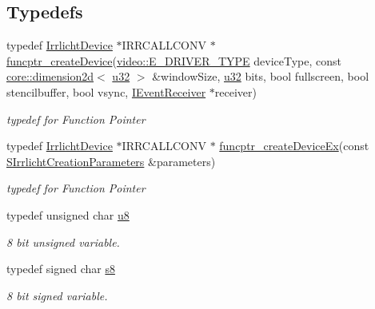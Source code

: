 \subsection*{Typedefs}
\begin{DoxyCompactItemize}
\item 
\mbox{\label{namespaceirr_a0ab845f2df3820e04106b7625e9919cd}} 
typedef \hyperlink{classirr_1_1IrrlichtDevice}{Irrlicht\+Device} $\ast$I\+R\+R\+C\+A\+L\+L\+C\+O\+NV $\ast$ \hyperlink{namespaceirr_a0ab845f2df3820e04106b7625e9919cd}{funcptr\+\_\+create\+Device}(\hyperlink{namespaceirr_1_1video_ae35a6de6d436c76107ad157fe42356d0}{video\+::\+E\+\_\+\+D\+R\+I\+V\+E\+R\+\_\+\+T\+Y\+PE} device\+Type, const \hyperlink{classirr_1_1core_1_1dimension2d}{core\+::dimension2d}$<$ \hyperlink{namespaceirr_a0416a53257075833e7002efd0a18e804}{u32} $>$ \&window\+Size, \hyperlink{namespaceirr_a0416a53257075833e7002efd0a18e804}{u32} bits, bool fullscreen, bool stencilbuffer, bool vsync, \hyperlink{classirr_1_1IEventReceiver}{I\+Event\+Receiver} $\ast$receiver)
\begin{DoxyCompactList}\small\item\em typedef for Function Pointer \end{DoxyCompactList}\item 
\mbox{\label{namespaceirr_a5137701377b2241305607fc37a27e9f8}} 
typedef \hyperlink{classirr_1_1IrrlichtDevice}{Irrlicht\+Device} $\ast$I\+R\+R\+C\+A\+L\+L\+C\+O\+NV $\ast$ \hyperlink{namespaceirr_a5137701377b2241305607fc37a27e9f8}{funcptr\+\_\+create\+Device\+Ex}(const \hyperlink{structirr_1_1SIrrlichtCreationParameters}{S\+Irrlicht\+Creation\+Parameters} \&parameters)
\begin{DoxyCompactList}\small\item\em typedef for Function Pointer \end{DoxyCompactList}\item 
typedef unsigned char \hyperlink{namespaceirr_a646874f69af8ff87fc10201b0254a761}{u8}
\begin{DoxyCompactList}\small\item\em 8 bit unsigned variable. \end{DoxyCompactList}\item 
typedef signed char \hyperlink{namespaceirr_adc3ec66d7537550be0fea1c9eeadd63d}{s8}
\begin{DoxyCompactList}\small\item\em 8 bit signed variable. \end{DoxyCompactList}\item 

\end{DoxyCompactItemize}

